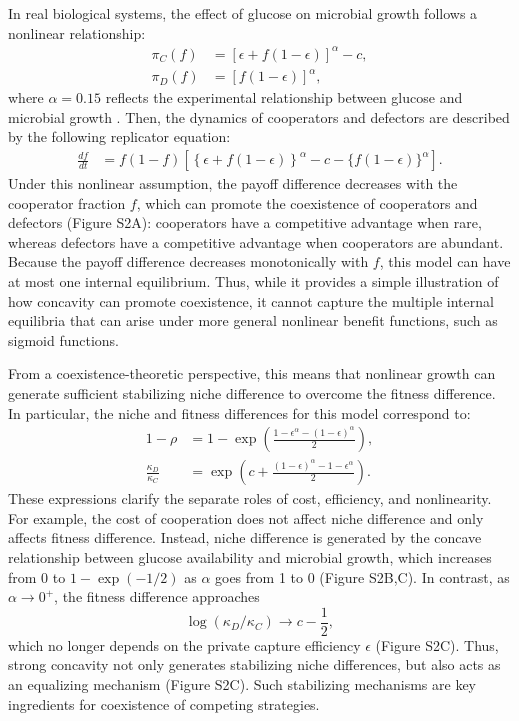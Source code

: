 \documentclass[12pt]{article}
\begin{document}
In real biological systems, the effect of glucose on microbial growth follows a nonlinear relationship:
\begin{align}
\pi_C(f) &= \left[\epsilon + f (1-\epsilon)\right]^\alpha - c,\\
\pi_D(f) &= [f (1-\epsilon)]^\alpha,
\end{align}
where $\alpha=0.15$ reflects the experimental relationship between glucose and microbial growth \citep{gore2009snowdrift}. 
Then, the dynamics of cooperators and defectors are described by the following replicator equation:
\begin{align}
\frac{df}{dt} &= f(1-f)\left[\left\{\epsilon + f (1-\epsilon)\right\}^\alpha - c - \{f (1-\epsilon)\}^\alpha \right].
\end{align}
Under this nonlinear assumption, the payoff difference decreases with the cooperator fraction $f$, which can promote the coexistence of cooperators and defectors (Figure S2A): cooperators have a competitive advantage when rare, whereas defectors have a competitive advantage when cooperators are abundant.
Because the payoff difference decreases monotonically with $f$, this model can have at most one internal equilibrium.
Thus, while it provides a simple illustration of how concavity can promote coexistence, it cannot capture the multiple internal equilibria that can arise under more general nonlinear benefit functions, such as sigmoid functions.

From a coexistence-theoretic perspective, this means that nonlinear growth can generate sufficient stabilizing niche difference to overcome the fitness difference. 
In particular, the niche and fitness differences for this model correspond to:
\begin{align}
1- \rho &= 1- \exp\left(\frac{1 - \epsilon^\alpha - (1-\epsilon)^\alpha }{2}\right),\\
\frac{\kappa_D}{\kappa_C} &= \exp\left(c + \frac{(1-\epsilon)^\alpha - 1 - \epsilon^{\alpha} }{2} \right).
\end{align}
These expressions clarify the separate roles of cost, efficiency, and nonlinearity.
For example, the cost of cooperation does not affect niche difference and only affects fitness difference.  
Instead, niche difference is generated by the concave relationship between glucose availability and microbial growth, which increases from 0 to $1-\exp(-1/2)$ as $\alpha$ goes from 1 to 0  (Figure S2B,C).
In contrast, as $\alpha \to 0^+$, the fitness difference approaches 
\begin{equation}
\log(\kappa_D/\kappa_C) \to c-\frac{1}{2},
\end{equation}
which no longer depends on the private capture efficiency $\epsilon$ (Figure S2C). 
Thus, strong concavity not only generates stabilizing niche differences, but also acts as an equalizing mechanism (Figure S2C).
Such stabilizing mechanisms are key ingredients for coexistence of competing strategies.
\end{document}
